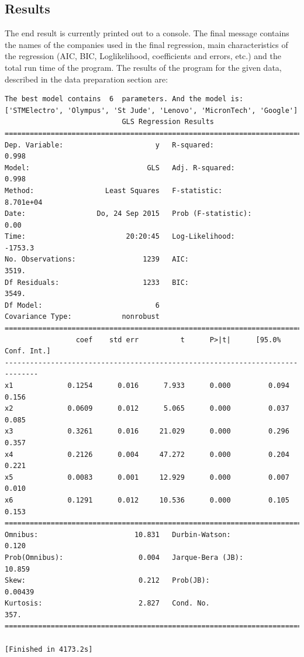 \documentclass{article}
\begin{document}
\subsection{Results}
The end result is currently printed out to a console. The final message contains the names of the companies used in the final regression, main characteristics of the regression (AIC, BIC, Loglikelihood, coefficients and errors, etc.) and the total run time of the program. 
The results of the program for the given data, described in the data preparation section are:
\begin{verbatim}
The best model contains  6  parameters. And the model is:
['STMElectro', 'Olympus', 'St Jude', 'Lenovo', 'MicronTech', 'Google']
                            GLS Regression Results                            
==============================================================================
Dep. Variable:                      y   R-squared:                       0.998
Model:                            GLS   Adj. R-squared:                  0.998
Method:                 Least Squares   F-statistic:                 8.701e+04
Date:                 Do, 24 Sep 2015   Prob (F-statistic):               0.00
Time:                        20:20:45   Log-Likelihood:                -1753.3
No. Observations:                1239   AIC:                             3519.
Df Residuals:                    1233   BIC:                             3549.
Df Model:                           6                                         
Covariance Type:            nonrobust                                         
==============================================================================
                 coef    std err          t      P>|t|      [95.0% Conf. Int.]
------------------------------------------------------------------------------
x1             0.1254      0.016      7.933      0.000         0.094     0.156
x2             0.0609      0.012      5.065      0.000         0.037     0.085
x3             0.3261      0.016     21.029      0.000         0.296     0.357
x4             0.2126      0.004     47.272      0.000         0.204     0.221
x5             0.0083      0.001     12.929      0.000         0.007     0.010
x6             0.1291      0.012     10.536      0.000         0.105     0.153
==============================================================================
Omnibus:                       10.831   Durbin-Watson:                   0.120
Prob(Omnibus):                  0.004   Jarque-Bera (JB):               10.859
Skew:                           0.212   Prob(JB):                      0.00439
Kurtosis:                       2.827   Cond. No.                         357.
==============================================================================

[Finished in 4173.2s]
\end{verbatim}
\end{document}
